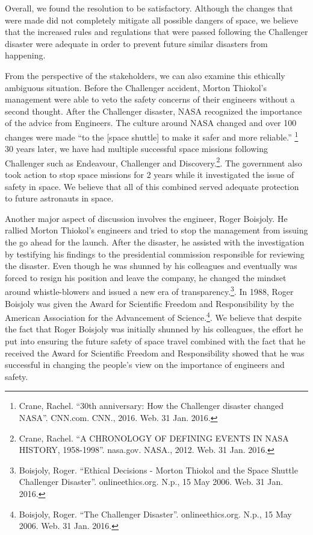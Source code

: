 \documentclass{article}
\newcommand{\q}[1]{``#1''}
\begin{document}
Overall, we found the resolution to be satisfactory. Although the changes that were made did not completely mitigate all possible dangers of space, we believe that the increased rules and regulations that were passed following the Challenger disaster were adequate in order to prevent future similar disasters from happening. \par
\vspace{5pt}
From the perspective of the stakeholders, we can also examine this ethically ambiguous situation. Before the Challenger accident, Morton Thiokol's management were able to veto the safety concerns of their engineers without a second thought. After the Challenger disaster, NASA recognized the importance of the advice from Engineers. The culture around NASA changed and over 100 changes were made \q{to the [space shuttle] to make it safer and more reliable.} \footnote{Crane, Rachel. \q{30th anniversary: How the Challenger disaster changed NASA}. CNN.com. CNN., 2016. Web. 31 Jan. 2016.} 30 years later, we have had multiple successful space missions following Challenger such as Endeavour, Challenger and Discovery.\footnote{Crane, Rachel. \q{A CHRONOLOGY OF DEFINING EVENTS IN
NASA HISTORY, 1958-1998}. nasa.gov. NASA., 2012. Web. 31 Jan. 2016.}. The government also took action to stop space missions for 2 years while it investigated the issue of safety in space. We believe that all of this combined served adequate protection to future astronauts in space.


Another major aspect of discussion involves the engineer, Roger Boisjoly. He rallied Morton Thiokol's engineers and tried to stop the management from issuing the go ahead for the launch. After the disaster, he assisted with the investigation by testifying his findings to the presidential commission responsible for reviewing the disaster. Even though he was shunned by his colleagues and eventually was forced to resign his position and leave the company, he changed the mindset around whistle-blowers and issued a new era of transparency.\footnote{Boisjoly, Roger. \q{Ethical Decisions - Morton Thiokol and the Space Shuttle Challenger Disaster}. onlineethics.org. N.p., 15 May 2006. Web. 31 Jan. 2016.}. In 1988, Roger Boisjoly was given the Award for Scientific Freedom and Responsibility by the American Association for the Advancement of Science.\footnote{Boisjoly, Roger. \q{The Challenger Disaster}. onlineethics.org. N.p., 15 May 2006. Web. 31 Jan. 2016.}. We believe that despite the fact that Roger Boisjoly was initially shunned by his colleagues, the effort he put into ensuring the future safety of space travel combined with the fact that he received the Award for Scientific Freedom and Responsibility showed that he was successful in changing the people's view on the importance of engineers and safety.
\end{document}
